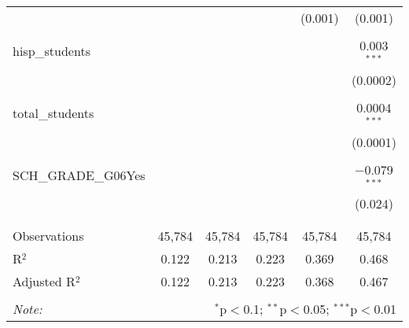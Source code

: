 \begin{table}[!htbp]
\begin{tabular}{@{\extracolsep{-2pt}}lccccc}
  &  &  &  & (0.001) & (0.001) \\ 
  & & & & & \\ 
 hisp\_students &  &  &  &  & 0.003$^{***}$ \\ 
  &  &  &  &  & (0.0002) \\ 
  & & & & & \\ 
 total\_students &  &  &  &  & 0.0004$^{***}$ \\ 
  &  &  &  &  & (0.0001) \\ 
  & & & & & \\ 
 SCH\_GRADE\_G06Yes &  &  &  &  & $-$0.079$^{***}$ \\ 
  &  &  &  &  & (0.024) \\ 
  & & & & & \\ 
\hline \\[-1.8ex] 
Observations & 45,784 & 45,784 & 45,784 & 45,784 & 45,784 \\ 
R$^{2}$ & 0.122 & 0.213 & 0.223 & 0.369 & 0.468 \\ 
Adjusted R$^{2}$ & 0.122 & 0.213 & 0.223 & 0.368 & 0.467 \\ 
\hline 
\hline \\[-1.8ex] 
\textit{Note:}  & \multicolumn{5}{r}{$^{*}$p$<$0.1; $^{**}$p$<$0.05; $^{***}$p$<$0.01} \\ 
\end{tabular} 
\end{table} 
